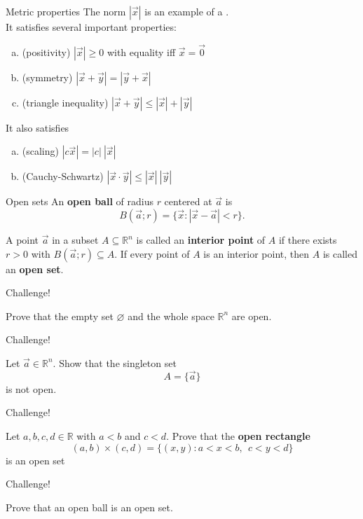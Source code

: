 \documentclass{beamer}
\begin{document}
\begin{frame}{Metric properties}
\pause
The norm $|\vec x|$ is an example of a .\\
\pause
It satisfies several important properties:
\pause
\begin{thm}
\begin{enumerate}[(a)]
\pause
\item (positivity) $|\vec x| \geq 0$ with equality iff $\vec x = \vec 0$
\pause
\item (symmetry) $|\vec x + \vec y| = |\vec y + \vec x|$
\pause
\item (triangle inequality) $|\vec x + \vec y| \leq |\vec x| + | \vec y|$
\end{enumerate}
\end{thm}
\pause
It also satisfies 
\pause
\begin{enumerate}[(a)]
\pause
\item (scaling)  $|c\vec x| = |c|\ |\vec x|$
\pause
\item (Cauchy-Schwartz) $|\vec x\cdot\vec y|\leq |\vec x|\ |\vec y|$
\end{enumerate}
\end{frame}

\begin{frame}{Open sets}
An \textbf{open ball} of radius $r$ centered at $\vec a$ is
\pause
$$B(\vec a;r)  = \{\vec x: |\vec x-\vec a| < r\}.$$
\pause
\begin{defn}
\pause
A point $\vec a$ in a subset $A\subseteq\mathbb{R}^n$ is called an \textbf{interior point} of $A$ if there exists $r>0$ with
$B(\vec a; r)\subseteq A$.
\pause
If every point of $A$ is an interior point, then $A$ is called an \textbf{open set}.
\end{defn}
\end{frame}

\begin{frame}{Challenge!}
\begin{prob}
Prove that the empty set $\varnothing$ and the whole space $\mathbb{R}^n$ are open.
\end{prob}
\end{frame}

\begin{frame}{Challenge!}
\begin{prob}
Let $\vec a\in\mathbb{R}^n$.
Show that the singleton set
$$A = \{\vec a\}$$
is not open.
\end{prob}
\end{frame}


\begin{frame}{Challenge!}
\begin{prob}
Let $a,b,c,d\in\mathbb{R}$ with $a < b$ and $c < d$.
Prove that the \textbf{open rectangle}
$$(a,b)\times (c,d) = \{(x,y): a < x < b,\ \ c < y < d\}$$
is an open set
\end{prob}
\end{frame}

\begin{frame}{Challenge!}
\begin{prob}
Prove that an open ball is an open set.
\end{prob}
\end{frame}
\end{document}

